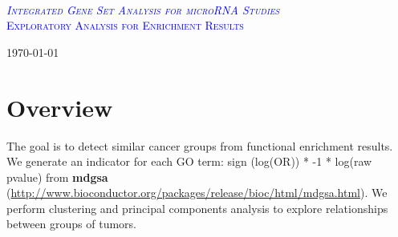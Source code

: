 \documentclass[a4paper,12pt]{article}
\begin{document}
\begin{titlepage}

\begin{center}

\textsc{ }\\[2cm]


\textsc{\textcolor{blue}{\Huge \em Integrated Gene Set Analysis for microRNA Studies}}\\[2.5cm]


\textsc{\textcolor{blue}{\Large Exploratory Analysis for Enrichment Results}}\\[2.5cm]







\vfill

{\large \today}

\end{center}

\end{titlepage}



\tableofcontents


\cleardoublepage




\section{Overview}\label{secOverview}

The goal is to detect similar cancer groups from functional enrichment results. We generate an indicator for each GO term:  sign (log(OR)) * -1 * log(raw pvalue) from \textbf{mdgsa} 
(\url{http://www.bioconductor.org/packages/release/bioc/html/mdgsa.html}). 
We perform clustering and principal components analysis to explore relationships between groups of tumors. 
\end{document}
